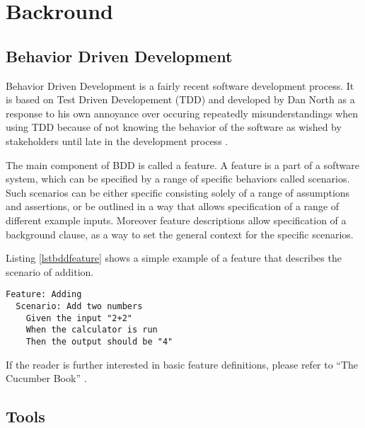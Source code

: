 \section{Backround}

\subsection{Behavior Driven Development}
\label{sub:bdd}
Behavior Driven Development is a fairly recent software development process. It is based on Test Driven Developement (TDD) and developed by Dan North as a response to his own annoyance over occuring repeatedly misunderstandings when using TDD because of not knowing the behavior of the software as wished by stakeholders until late in the development process \cite{north2006}.

The main component of BDD is called a feature. 
A feature is a part of a software system,
which can be specified by a range of specific behaviors called scenarios.
Such scenarios can be either specific consisting solely of a range of
assumptions and assertions, or be outlined in a way that allows
specification of a range of different example inputs.
Moreover feature descriptions allow specification of a background clause,
as a way to set the general context for the specific scenarios.

Listing \ref{lstbddfeature} shows a simple example of a feature that describes the scenario of addition. 


\begin{lstlisting}[caption={Sample Addition Feature},label={lst:bddfeature}]
Feature: Adding
  Scenario: Add two numbers
    Given the input "2+2"
    When the calculator is run 
    Then the output should be "4"
\end{lstlisting}

If the reader is further interested in basic feature definitions,
please refer to “The Cucumber Book” \cite{hellesoy2012}.

\subsection{Tools}